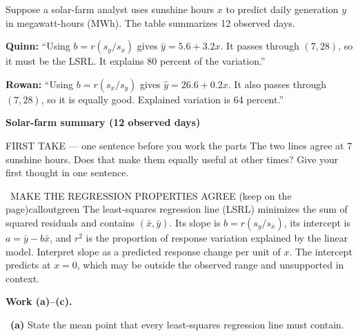 \documentclass[11pt]{article}
\begin{document}


Suppose a solar-farm analyst uses sunshine hours $x$ to predict daily generation $y$ in megawatt-hours (MWh). The table summarizes 12 observed days.\par\smallskip \textbf{Quinn:} ``Using $b=r(s_y/s_x)$ gives $\hat y=5.6+3.2x$. It passes through $(7,28)$, so it must be the LSRL. It explains 80 percent of the variation.''\par \textbf{Rowan:} ``Using $b=r(s_x/s_y)$ gives $\hat y=26.6+0.2x$. It also passes through $(7,28)$, so it is equally good. Explained variation is 64 percent.''\par
\begin{center}
\textbf{Solar-farm summary (12 observed days)}\par\smallskip
{}
\end{center}
\begin{firsttakebox}{FIRST TAKE --- one sentence before you work the parts}
The two lines agree at 7 sunshine hours. Does that make them equally useful at other times? Give your first thought in one sentence.
\workspace{0.65in}
\end{firsttakebox}

\begin{callout}{\IconBook\ MAKE THE REGRESSION PROPERTIES AGREE (keep on the page)}{calloutgreen}
The least-squares regression line (LSRL) minimizes the sum of squared residuals and contains
$(\bar x,\bar y)$. Its slope is $b=r(s_y/s_x)$, its intercept is
$a=\bar y-b\bar x$, and $r^2$ is the proportion of response variation explained by the
linear model. Interpret slope as a predicted response change per unit of $x$. The intercept
predicts at $x=0$, which may be outside the observed range and unsupported in context.
\end{callout}

\newpage
\textbf{Work (a)--(c).}\par\smallskip

~\textbf{(a)} State the mean point that every least-squares regression line must contain.\par
\workspace{0.55in}
\end{document}
